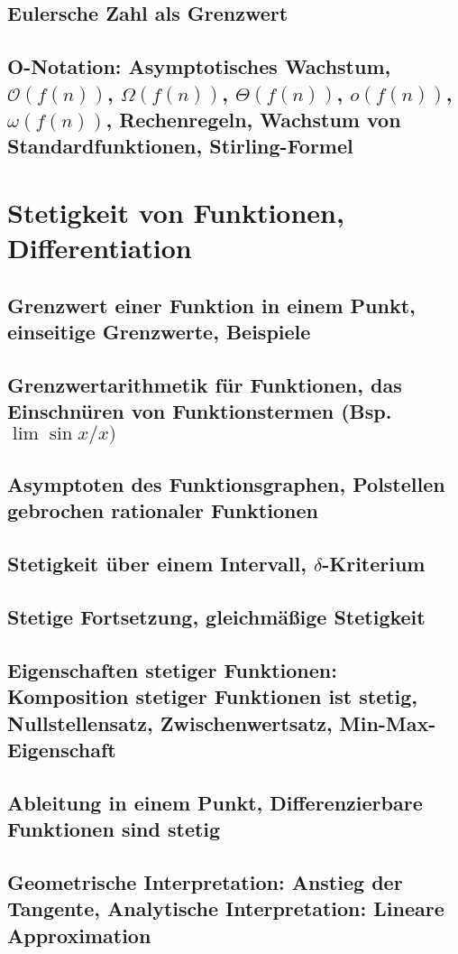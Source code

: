 \subsection{Eulersche Zahl als Grenzwert}
\subsection{O-Notation: Asymptotisches Wachstum, $\mathcal{O}(f(n))$, $\Omega(f (n))$, $\Theta(f (n))$, $o(f(n))$, $\omega(f (n))$, Rechenregeln, Wachstum von Standardfunktionen, Stirling-Formel}

\section{Stetigkeit von Funktionen, Differentiation}
\subsection{Grenzwert einer Funktion in einem Punkt, einseitige Grenzwerte, Beispiele}
\subsection{Grenzwertarithmetik für Funktionen, das Einschnüren von Funktionstermen (Bsp. $\lim \sin x/x)$}
\subsection{Asymptoten des Funktionsgraphen, Polstellen gebrochen rationaler Funktionen}
\subsection{Stetigkeit über einem Intervall, $\delta$-Kriterium}
\subsection{Stetige Fortsetzung, gleichmäßige Stetigkeit}
\subsection{Eigenschaften stetiger Funktionen: Komposition stetiger Funktionen ist stetig, Nullstellensatz, Zwischenwertsatz, Min-Max-Eigenschaft}
\subsection{Ableitung in einem Punkt, Differenzierbare Funktionen sind stetig}
\subsection{Geometrische Interpretation: Anstieg der Tangente, Analytische Interpretation:
Lineare Approximation}
